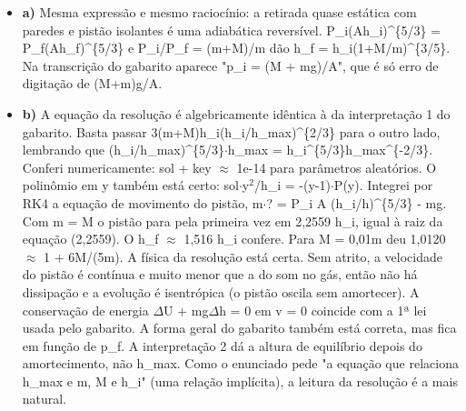 \documentclass{article}%
\begin{document}
\begin{itemize}%
\item%
\textbf{a)} Mesma expressão e mesmo raciocínio: a retirada quase estática com paredes e pistão isolantes é uma adiabática reversível. P\_i(Ah\_i)\^{}\{5/3\} = P\_f(Ah\_f)\^{}\{5/3\} e P\_i/P\_f = (m+M)/m dão h\_f = h\_i(1+M/m)\^{}\{3/5\}. Na transcrição do gabarito aparece "p\_i = (M + mg)/A", que é só erro de digitação de (M+m)g/A.%
\item%
\textbf{b)} A equação da resolução é algebricamente idêntica à da interpretação 1 do gabarito. Basta passar 3(m+M)h\_i(h\_i/h\_max)\^{}\{2/3\} para o outro lado, lembrando que (h\_i/h\_max)\^{}\{5/3\}$\cdot$h\_max = h\_i\^{}\{5/3\}h\_max\^{}\{{-}2/3\}. Conferi numericamente: sol + key $\approx$ 1e{-}14 para parâmetros aleatórios. O polinômio em y também está certo: sol$\cdot$y$^2$/h\_i = -(y-1)$\cdot$P(y). Integrei por RK4 a equação de movimento do pistão, m$\cdot$? = P\_i A (h\_i/h)\^{}\{5/3\} - mg. Com m = M o pistão para pela primeira vez em 2,2559 h\_i, igual à raiz da equação (2,2559). O h\_f $\approx$ 1,516 h\_i confere. Para M = 0,01m deu 1,0120 $\approx$ 1 + 6M/(5m). A física da resolução está certa. Sem atrito, a velocidade do pistão é contínua e muito menor que a do som no gás, então não há dissipação e a evolução é isentrópica (o pistão oscila sem amortecer). A conservação de energia $\Delta$U + mg$\Delta$h = 0 em v = 0 coincide com a 1ª lei usada pelo gabarito. A forma geral do gabarito também está correta, mas fica em função de p\_f. A interpretação 2 dá a altura de equilíbrio depois do amortecimento, não h\_max. Como o enunciado pede "a equação que relaciona h\_max e m, M e h\_i" (uma relação implícita), a leitura da resolução é a mais natural.%
\end{itemize}%
\end{document}

